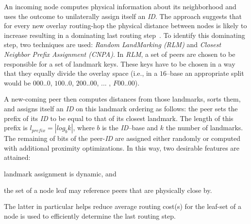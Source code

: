 An incoming node computes physical information about its neighborhood
and uses the outcome to unilaterally assign itself an \emph{ID}.
The approach suggests that for every new overlay routing-hop 
the physical distance between nodes is likely to increase
resulting in a dominating
last routing step~\cite{antony_pastry_2001,CDCR2002a}.
To identify this dominating step, two techniques are used: 
\emph{Random LandMarking (RLM)} and 
\emph{Closest Neighbor Prefix Assignment (CNPA)}.
In \emph{RLM}, a set of peers are chosen to be responsible 
for a set of landmark keys. These keys have to be chosen in a way that they
equally divide the overlay space (i.e., in a $16$--base an appropriate split
would be $000..0$, $100..0$, $200..00$, ... , $F00..00$).
%

A new-coming peer then computes distances from those landmarks,
sorts them, and assigns itself an \emph{ID} on this 
landmark ordering as follows:
the peer sets the prefix of its \emph{ID} to be equal to that 
of its closest landmark.
The length of this prefix is 
$l_{prefix}=|log_b k|$, where $b$ is the \emph{ID}--base 
and $k$ the number of landmarks. 
The remaining of bits of the peer-\emph{ID} are assigned either 
randomly or computed with additional proximity optimizations.
In this way, two desirable features are attained:
\begin{inparaenum}
  \item landmark assignment is dynamic, and
  \item the set of a node leaf may reference peers that are 
	physically close by.
\end{inparaenum}
The latter in particular helps reduce average routing cost(s)
for the leaf-set of a node is used to efficiently determine the 
last routing step.

